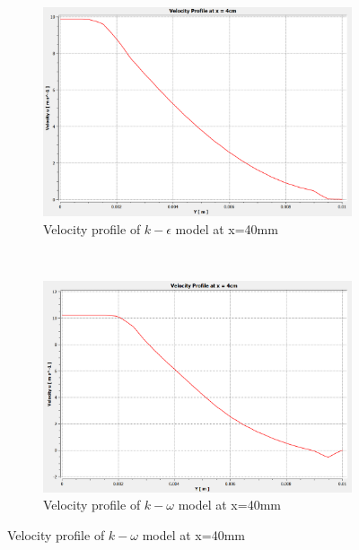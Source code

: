 \begin{figure}[H]
     ~
    \begin{subfigure}{.48\textwidth}
    \centering
    \includegraphics[width=.95\linewidth]{images/task2/task2-1/cs6.png}
    \caption{Velocity profile of $k-\epsilon$ model at x=40mm}
\end{subfigure}
    ~
    \begin{subfigure}{.48\textwidth}
    \centering
    \includegraphics[width=.95\linewidth]{images/task2/task2-2/cs6.png}
    \caption{Velocity profile of $k-\omega$ model at x=40mm}
\end{subfigure}



\end{figure}
